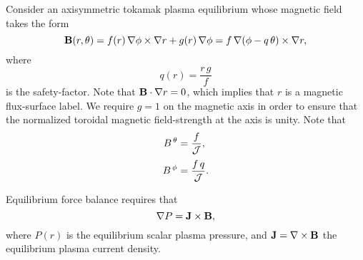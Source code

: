 \documentclass[12pt,prb,aps,notitlepage]{revtex4-1}
\begin{document}
Consider an axisymmetric tokamak plasma equilibrium whose magnetic field takes the form
\begin{equation}
{\bf B}(r,\theta) = f(r)\,\nabla\phi\times \nabla r + g(r)\,\nabla\phi = f\,\nabla(\phi-q\,\theta)\times \nabla r,
\end{equation}
where
\begin{equation}\label{q}
q(r) = \frac{r\,g}{f}
\end{equation}
is the safety-factor. Note that ${\bf B}\cdot\nabla r=0$, which implies that $r$ is a magnetic flux-surface label.
We require $g=1$ on the magnetic axis in order to ensure that the normalized toroidal magnetic field-strength at the  axis is unity.  
Note that 
\begin{align}
B^{\,\theta}&= \frac{f}{\cal J},\\[0.5ex]
B^{\,\phi} &=\frac{f\,q}{\cal J}.
\end{align}

Equilibrium force balance requires that
\begin{equation}\label{e15c}
 \nabla P={\bf J}\times {\bf B},
\end{equation}
where $P(r)$ is the equilibrium scalar plasma pressure, and ${\bf J}=\nabla\times {\bf B}$ the equilibrium plasma current density. 
\end{document}
